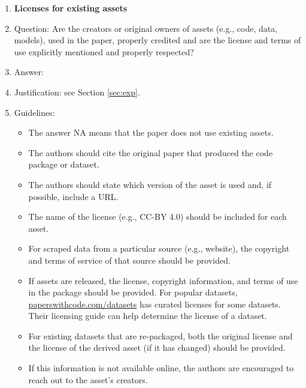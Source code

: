 \documentclass{article}
\theoremstyle{plain}
\theoremstyle{definition}
\theoremstyle{remark}
\begin{document}
\begin{enumerate}
\item {\bf Licenses for existing assets}
    \item[] Question: Are the creators or original owners of assets (e.g., code, data, models), used in the paper, properly credited and are the license and terms of use explicitly mentioned and properly respected?
    \item[] Answer: \answerYes{} %
    \item[] Justification: see Section \ref{sec:exp}.
    \item[] Guidelines:
    \begin{itemize}
        \item The answer NA means that the paper does not use existing assets.
        \item The authors should cite the original paper that produced the code package or dataset.
        \item The authors should state which version of the asset is used and, if possible, include a URL.
        \item The name of the license (e.g., CC-BY 4.0) should be included for each asset.
        \item For scraped data from a particular source (e.g., website), the copyright and terms of service of that source should be provided.
        \item If assets are released, the license, copyright information, and terms of use in the package should be provided. For popular datasets, \url{paperswithcode.com/datasets} has curated licenses for some datasets. Their licensing guide can help determine the license of a dataset.
        \item For existing datasets that are re-packaged, both the original license and the license of the derived asset (if it has changed) should be provided.
        \item If this information is not available online, the authors are encouraged to reach out to the asset's creators.
    \end{itemize}


\end{enumerate}
\end{document}
